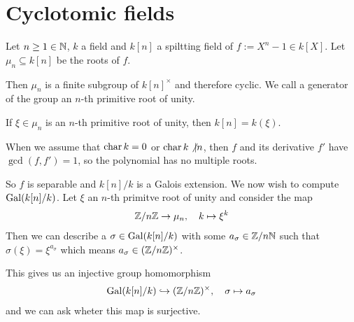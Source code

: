 \section{Cyclotomic fields}
Let $n \geq 1 \in \mathbb{N}$, $k$ a field and $k[n]$ a spiltting field of $f := X^{n} - 1 \in k[X]$.
Let $\mu_n \subseteq k[n]$ be the roots of $f$.

Then $\mu_n$ is a finite subgroup of $k[n]^{\times}$ and therefore cyclic.
We call a generator of the group an $n$-th primitive root of unity.

If $\xi \in \mu_n$ is an $n$-th primitive root of unity, then $k[n] = k(\xi)$.

When we assume that $\operatorname{char} k = 0$ or $\operatorname{char} k\not|n$, then $f$ and its derivative $f'$ have $\gcd(f,f')=1$, so the polynomial has no multiple roots.

So $f$ is separable and $k[n]/k$ is a Galois extension. We now wish to compute $\operatorname{Gal}(k[n]/k)$.
Let $\xi$ an $n$-th primitve root of unity and consider the map
\begin{align*}
  \mathbb{Z}/n\mathbb{Z} \to \mu_n, \quad k \mapsto \xi^{k}
\end{align*}
Then we can describe a $\sigma \in \operatorname{Gal}(k[n]/k)$ with some $a_{\sigma} \in \mathbb{Z}/n\mathbb{N}$ such that $\sigma(\xi) = \xi^{a_{\sigma}}$ which means $a_{\sigma} \in (\mathbb{Z}/n\mathbb{Z})^{\times}$.


This gives us an injective group homomorphism
\begin{align*}
  \operatorname{Gal}(k[n]/k) \hookrightarrow (\mathbb{Z}/n\mathbb{Z})^{\times}, \quad \sigma \mapsto  a_{\sigma}
\end{align*}
and we can ask wheter this map is surjective.

